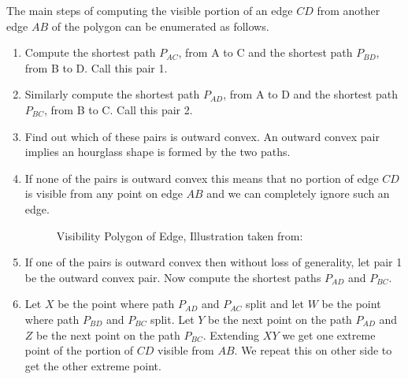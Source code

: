 \documentclass[a4paper,10pt]{article}
\begin{document}
The main steps of computing the visible portion of an edge $CD$ from another edge $AB$ of the polygon can be enumerated as follows.

\begin{enumerate}
\item
Compute the shortest path $P_{AC}$, from A to C and the shortest path $P_{BD}$, from B to D. Call this pair 1.
\item
Similarly compute the shortest path  $P_{AD}$, from A to D and the shortest path  $P_{BC}$,  from B to C. Call this pair 2.
\item
Find out which of these pairs is outward convex. An outward convex pair implies an hourglass shape is formed by the two paths.
\item
If none of the pairs is outward convex this means that no portion of edge $CD$ is visible from any point on edge $AB$ and we can 
completely ignore such an edge.

\begin{figure}[h]
\begin{center}
\caption{\label{fig:Visibility Polygon of Edge}Visibility Polygon of Edge, Illustration taken from:\cite{key3}}
\end{center}
\end{figure}

\item
If one of the pairs is outward convex then without loss of generality, let pair 1 be the outward convex pair. Now compute the shortest 
paths  $P_{AD}$ and  $P_{BC}$.

\item
Let $X$ be the point where path $P_{AD}$ and $P_{AC}$ split and let  $W$ be the point where path $P_{BD}$ and $P_{BC}$ split. Let $Y$ be
the next point on the path  $P_{AD}$ and $Z$ be the next point on the path   $P_{BC}$. Extending $XY$ we get one extreme point of the 
portion of $CD$ visible from $AB$. We repeat this on other side to get the other extreme point.


\end{enumerate}
\end{document}
